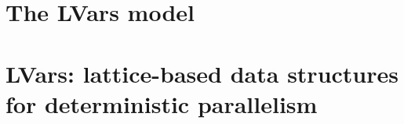 \ifdefined\JOURNAL
\chapter{The LVars model}\label{ch:lvars} %

\fi

\ifdefined\DISSERTATION
\chapter{LVars: lattice-based data structures for deterministic parallelism}\label{ch:lvars} %














\fi
